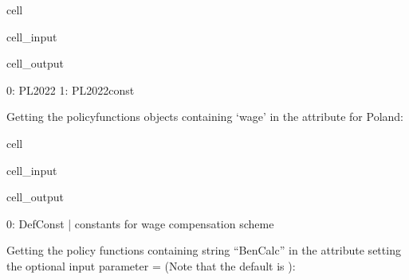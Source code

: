 \documentclass[letterpaper,10pt,english]{sphinxmanual}
\begin{document}
\begin{sphinxuseclass}{cell}
\begin{sphinxuseclass}{cell_input}
\begin{sphinxVerbatim}[commandchars=\\\{\}]
\PYG{p}{[}\PYG{p}{]}
\end{sphinxVerbatim}

\end{sphinxuseclass}
\begin{sphinxuseclass}{cell_output}
\begin{sphinxVerbatim}[commandchars=\\\{\}]
0: PL\PYGZus{}2022      
1: PL\PYGZus{}2022\PYGZus{}const
\end{sphinxVerbatim}

\end{sphinxuseclass}
\end{sphinxuseclass}
\sphinxAtStartPar
Getting the policy\sphinxhyphen{}functions objects containing ‘wage’ in the  attribute for Poland:

\begin{sphinxuseclass}{cell}
\begin{sphinxuseclass}{cell_input}
\begin{sphinxVerbatim}[commandchars=\\\{\}]
\PYG{p}{[}\PYG{p}{]}\PYG{p}{[}\PYG{p}{]}
\end{sphinxVerbatim}

\end{sphinxuseclass}
\begin{sphinxuseclass}{cell_output}
\begin{sphinxVerbatim}[commandchars=\\\{\}]
0: DefConst    |    constants for wage compensation scheme 
\end{sphinxVerbatim}

\end{sphinxuseclass}
\end{sphinxuseclass}
\sphinxAtStartPar
Getting the policy functions containing string “BenCalc” in the attribute  setting the optional input parameter = (Note that the default is ):
\end{document}
